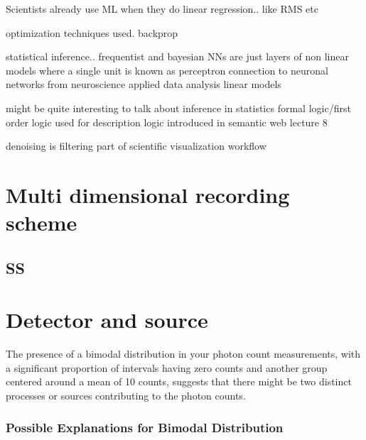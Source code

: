 Scientists already use ML when they do linear regression.. like RMS etc

optimization techniques used. backprop

statistical inference.. frequentist and bayesian
NNs are just layers of non linear models where a single unit is known as perceptron
connection to neuronal networks from neuroscience
applied data analysis linear models 

might be quite interesting to talk about inference in statistics 
formal logic/first order logic used for
description logic introduced in semantic web lecture 8


denoising is filtering part of scientific visualization workflow

\section{Multi dimensional recording scheme}
\subsection{SS}
\section{Detector and source}
The presence of a bimodal distribution in your photon count
measurements, with a significant proportion of intervals having zero
counts and another group centered around a mean of 10 counts, suggests
that there might be two distinct processes or sources contributing to
the photon counts.

\hypertarget{possible-explanations-for-bimodal-distribution}{%
\subsubsection{Possible Explanations for Bimodal
Distribution}\label{possible-explanations-for-bimodal-distribution}}

